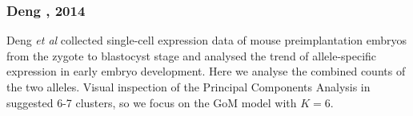 


\subsubsection{Deng , 2014}

Deng \textit{et al} collected single-cell expression data of mouse preimplantation embryos from the zygote to blastocyst stage \cite{Deng2014} and analysed the trend of allele-specific expression in early embryo development. Here we analyse the combined counts of the two alleles. Visual inspection of the Principal Components Analysis in \cite{Deng2014} suggested 6-7 clusters, so we focus on the GoM model with $K=6$. 

